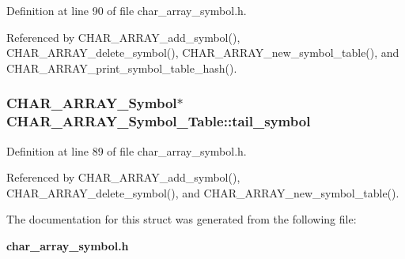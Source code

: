Definition at line 90 of file char\_\-array\_\-symbol.h.

Referenced by CHAR\_\-ARRAY\_\-add\_\-symbol(), CHAR\_\-ARRAY\_\-delete\_\-symbol(), CHAR\_\-ARRAY\_\-new\_\-symbol\_\-table(), and CHAR\_\-ARRAY\_\-print\_\-symbol\_\-table\_\-hash().
\subsubsection{\setlength{\rightskip}{0pt plus 5cm}\bf{CHAR\_\-ARRAY\_\-Symbol}$\ast$ \bf{CHAR\_\-ARRAY\_\-Symbol\_\-Table::tail\_\-symbol}}\label{structCHAR__ARRAY__Symbol__Table_2c730932582f93b6099cac0e16eebf5a}




Definition at line 89 of file char\_\-array\_\-symbol.h.

Referenced by CHAR\_\-ARRAY\_\-add\_\-symbol(), CHAR\_\-ARRAY\_\-delete\_\-symbol(), and CHAR\_\-ARRAY\_\-new\_\-symbol\_\-table().

The documentation for this struct was generated from the following file:\begin{CompactItemize}
\item 
\bf{char\_\-array\_\-symbol.h}\end{CompactItemize}
